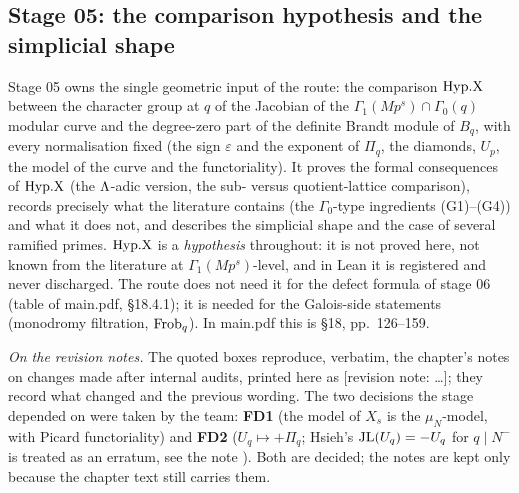 \subsection{Stage 05: the comparison hypothesis and the simplicial shape}\label{ss:stage05}

Stage 05 owns the single geometric input of the route: the comparison $\mathrm{Hyp.X}$ between the character group at $q$ of the
Jacobian of the $\Gamma_1(Mp^s)\cap\Gamma_0(q)$ modular curve and the degree-zero part of the definite Brandt module of $B_q$,
with every normalisation fixed (the sign $\varepsilon$ and the exponent of $\Pi_q$, the diamonds, $U_p$, the model of the curve and
the functoriality). It proves the formal consequences of $\mathrm{Hyp.X}$ (the $\Lambda$-adic version, the sub- versus quotient-lattice
comparison), records precisely what the literature contains (the $\Gamma_0$-type ingredients (G1)--(G4)) and what it does not,
and describes the simplicial shape and the case of several ramified primes. $\mathrm{Hyp.X}$ is a \emph{hypothesis} throughout: it is
not proved here, not known from the literature at $\Gamma_1(Mp^s)$-level, and in Lean it is registered and never discharged.
The route does not need it for the defect formula of stage 06 (table of main.pdf, \S18.4.1); it is needed for the Galois-side
statements (monodromy filtration, $\mathrm{Frob}_q$). In main.pdf this is \S18, pp.~126--159.

\emph{On the revision notes.} The quoted boxes reproduce, verbatim, the chapter's notes on changes made after internal audits,
printed here as \textup{[revision note: \dots]}; they record what changed and the previous wording. The two decisions the stage
depended on were taken by the team: \textbf{FD1} (the model of $X_s$ is the $\mu_N$-model, with Picard functoriality) and
\textbf{FD2} ($U_q\mapsto+\Pi_q$; Hsieh's $\mathrm{JL}(U_q)=-U_q$ for $q\mid N^-$ \cite[\S4.5, p.~34]{Hs} is treated as an erratum,
see the note \cite{LLhsieh}). Both are decided; the notes are kept only because the chapter text still carries them.

